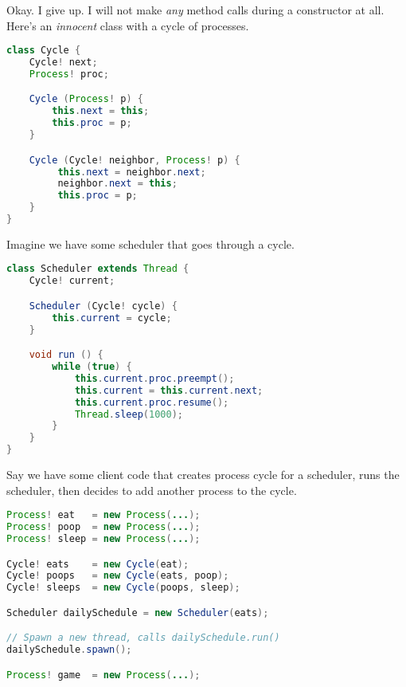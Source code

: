 \documentclass{article}
\begin{document}
\begin{example}
  Okay.
  I give up.
  I will not make \textit{any} method calls during a constructor at all.
  Here's an \textit{innocent} class with a cycle of processes.
\begin{lstlisting}[escapechar=|, language=Java]
class Cycle {
    Cycle! next;
    Process! proc;

    Cycle (Process! p) {
        this.next = this;
        this.proc = p;
    }

    Cycle (Cycle! neighbor, Process! p) {
         this.next = neighbor.next;
         neighbor.next = this;
         this.proc = p;
    }
}
\end{lstlisting}
  Imagine we have some scheduler that goes through a cycle.
\begin{lstlisting}[escapechar=|, language=Java]
class Scheduler extends Thread {
    Cycle! current;

    Scheduler (Cycle! cycle) {
        this.current = cycle;
    }

    void run () {
        while (true) {
            this.current.proc.preempt();
            this.current = this.current.next;
            this.current.proc.resume();
            Thread.sleep(1000);
        }
    }
}
\end{lstlisting}
  Say we have some client code that creates process cycle for a scheduler, runs the scheduler, then decides to add another process to the cycle.
\begin{lstlisting}[escapechar=|, language=Java]
Process! eat   = new Process(...);
Process! poop  = new Process(...);
Process! sleep = new Process(...);

Cycle! eats    = new Cycle(eat);
Cycle! poops   = new Cycle(eats, poop);
Cycle! sleeps  = new Cycle(poops, sleep);

Scheduler dailySchedule = new Scheduler(eats);

// Spawn a new thread, calls dailySchedule.run()
dailySchedule.spawn();

Process! game  = new Process(...);


\end{lstlisting}
\end{example}
\end{document}
